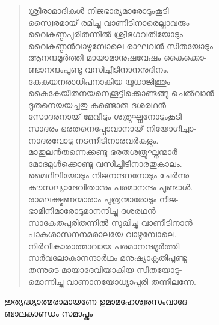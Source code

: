 \begin{verse}
ശ്രീരാമാദികള്‍ നിജഭാര്യമാരോടുംകൂടി\\
സ്വൈരമായ് രമിച്ചു വാണീടിനാരെല്ലാവരും\\
വൈകുണ്ഠപുരിതന്നില്‍ ശ്രീഭഗവതിയോടും\\
വൈകുണ്ഠന്‍വാഴുമ്പോലെ രാഘവന്‍ സീതയോടും\\
ആനന്ദമൂര്‍ത്തി മായാമാനുഷവേഷം കൈക്കൊ-\\
ണ്ടാനന്ദംപൂണ്ടു വസിച്ചീടിനാനനുദിനം.\\
കേകയനരാധിപനാകിയ യുധാജിത്തും\\
കൈകേയീതനയനെക്കൂട്ടിക്കൊണ്ടങ്ങു ചെല്‍വാന്‍\\
ദൂതനെയയച്ചതു കണ്ടൊരു ദശരഥന്‍\\
സോദരനായ് മേവീടും ശത്രുഘ്നനോടുംകൂടി\\
സാദരം ഭരതനെപ്പോവാനായ് നിയോഗിച്ചാ-\\
നാദരവോടു നടന്നീടിനാരവര്‍കളും.\\
മാതുലന്‍തന്നെക്കണ്ടു ഭരതശത്രുഘ്നന്മാര്‍\\
മോദമുള്‍ക്കൊണ്ടു വസിച്ചീടിനാരതുകാലം.\\
മൈഥിലിയോടും നിജനന്ദനനോടും ചേര്‍ന്നു\\
കൗസല്യാദേവിതാനും പരമാനന്ദം പൂണ്ടാള്‍.\\
രാമലക്ഷ്മണന്മാരാം പുത്രന്മാരോടും നിജ-\\
ഭാമിനിമാരോടുമാനന്ദിച്ചു ദശരഥന്‍\\
സാകേതപുരിതന്നില്‍ സുഖിച്ചു വാണീടിനാന്‍\\
പാകശാസനനമരാലയേ വാഴുമ്പോലെ.\\
നിര്‍വികാരാത്മാവായ പരമാനന്ദമൂര്‍ത്തി\\
സര്‍വലോകാനന്ദാര്‍ഥം മനുഷ്യാകൃതിപൂണ്ടു\\
തന്നുടെ മായാദേവിയാകിയ സീതയോടു-\\
മൊന്നിച്ചു വാണാനയോധ്യാപുരി തന്നിലന്നേ.
\end{verse}

\begin{center}
ഇത്യദ്ധ്യാത്മരാമായണേ ഉമാമഹേശ്വരസംവാദേ\\
ബാലകാണ്ഡം സമാപ്തം
\end{center}
		



